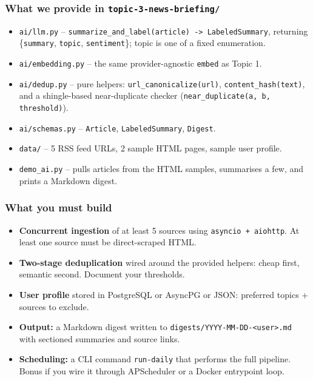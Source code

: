 \documentclass[11pt,a4paper]{article}
\begin{document}
\subsubsection{What we provide in \texttt{topic-3-news-briefing/}}
\begin{itemize}[topsep=2pt,itemsep=1pt]
  \item \texttt{ai/llm.py} -- \texttt{summarize\_and\_label(article) -> LabeledSummary}, returning \{\texttt{summary}, \texttt{topic}, \texttt{sentiment}\}; topic is one of a fixed enumeration.
  \item \texttt{ai/embedding.py} -- the same provider-agnostic \texttt{embed} as Topic 1.
  \item \texttt{ai/dedup.py} -- pure helpers: \texttt{url\_canonicalize(url)}, \texttt{content\_hash(text)}, and a shingle-based near-duplicate checker (\texttt{near\_duplicate(a, b, threshold)}).
  \item \texttt{ai/schemas.py} -- \texttt{Article}, \texttt{LabeledSummary}, \texttt{Digest}.
  \item \texttt{data/} -- 5 RSS feed URLs, 2 sample HTML pages, sample user profile.
  \item \texttt{demo\_ai.py} -- pulls articles from the HTML samples, summarises a few, and prints a Markdown digest.
\end{itemize}

\subsubsection{What you must build}
\begin{itemize}[topsep=2pt,itemsep=1pt]
  \item \textbf{Concurrent ingestion} of at least 5 sources using \texttt{asyncio + aiohttp}. At least one source must be direct-scraped HTML.
  \item \textbf{Two-stage deduplication} wired around the provided helpers: cheap first, semantic second. Document your thresholds.
  \item \textbf{User profile} stored in PostgreSQL or AsyncPG or JSON: preferred topics + sources to exclude.
  \item \textbf{Output:} a Markdown digest written to \texttt{digests/YYYY-MM-DD-<user>.md} with sectioned summaries and source links.
  \item \textbf{Scheduling:} a CLI command \texttt{run-daily} that performs the full pipeline. Bonus if you wire it through APScheduler or a Docker entrypoint loop.
\end{itemize}
\end{document}
